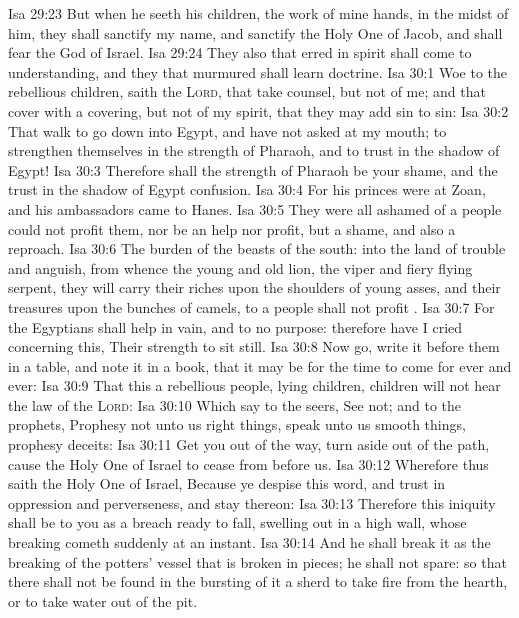 \vs Isa 29:23 But when he seeth his children, the work of mine hands, in the midst of him, they shall sanctify my name, and sanctify the Holy One of Jacob, and shall fear the God of Israel.
\vs Isa 29:24 They also that erred in spirit shall come to understanding, and they that murmured shall learn doctrine.
\vs Isa 30:1 Woe to the rebellious children, saith the \textsc{Lord}, that take counsel, but not of me; and that cover with a covering, but not of my spirit, that they may add sin to sin:
\vs Isa 30:2 That walk to go down into Egypt, and have not asked at my mouth; to strengthen themselves in the strength of Pharaoh, and to trust in the shadow of Egypt!
\vs Isa 30:3 Therefore shall the strength of Pharaoh be your shame, and the trust in the shadow of Egypt  confusion.
\vs Isa 30:4 For his princes were at Zoan, and his ambassadors came to Hanes.
\vs Isa 30:5 They were all ashamed of a people  could not profit them, nor be an help nor profit, but a shame, and also a reproach.
\vs Isa 30:6 The burden of the beasts of the south: into the land of trouble and anguish, from whence  the young and old lion, the viper and fiery flying serpent, they will carry their riches upon the shoulders of young asses, and their treasures upon the bunches of camels, to a people  shall not profit .
\vs Isa 30:7 For the Egyptians shall help in vain, and to no purpose: therefore have I cried concerning this, Their strength  to sit still.
\vs Isa 30:8 Now go, write it before them in a table, and note it in a book, that it may be for the time to come for ever and ever:
\vs Isa 30:9 That this  a rebellious people, lying children, children  will not hear the law of the \textsc{Lord}:
\vs Isa 30:10 Which say to the seers, See not; and to the prophets, Prophesy not unto us right things, speak unto us smooth things, prophesy deceits:
\vs Isa 30:11 Get you out of the way, turn aside out of the path, cause the Holy One of Israel to cease from before us.
\vs Isa 30:12 Wherefore thus saith the Holy One of Israel, Because ye despise this word, and trust in oppression and perverseness, and stay thereon:
\vs Isa 30:13 Therefore this iniquity shall be to you as a breach ready to fall, swelling out in a high wall, whose breaking cometh suddenly at an instant.
\vs Isa 30:14 And he shall break it as the breaking of the potters' vessel that is broken in pieces; he shall not spare: so that there shall not be found in the bursting of it a sherd to take fire from the hearth, or to take water  out of the pit.
